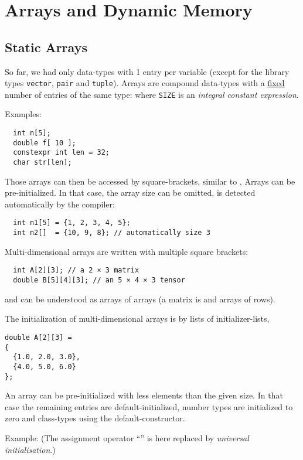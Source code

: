\section{Arrays and Dynamic Memory}
\subsection{Static Arrays}
So far, we had only data-types with 1 entry per variable (except for the library types \texttt{vector}, \texttt{pair} and \texttt{tuple}).
Arrays are compound data-types with a \underline{fixed} number of entries of the same type:
%
%
where \texttt{SIZE} is an \emph{integral constant expression}.

Examples:
\begin{verbatim}
  int n[5];
  double f[ 10 ];
  constexpr int len = 32;
  char str[len];
\end{verbatim}
%
Those arrays can then be accessed by square-brackets, similar to , \eg
%
%
Arrays can be pre-initialized. In that case, the array size can be omitted, \ie is detected
automatically by the compiler:
\begin{verbatim}
  int n1[5] = {1, 2, 3, 4, 5};
  int n2[]  = {10, 9, 8}; // automatically size 3
\end{verbatim}

Multi-dimensional arrays are written with multiple square brackets:
%
\begin{verbatim}
  int A[2][3]; // a 2 × 3 matrix
  double B[5][4][3]; // an 5 × 4 × 3 tensor
\end{verbatim}
%
and can be understood as arrays of arrays (a matrix is and arrays of rows).

The initialization of multi-dimensional arrays is by lists of initializer-lists, \eg
%
\begin{verbatim}
double A[2][3] =
{
  {1.0, 2.0, 3.0},
  {4.0, 5.0, 6.0}
};
\end{verbatim}

\begin{rem}
  An array can be pre-initialized with less elements than the given size. In that case the remaining entries are default-initialized, \ie
  number types are initialized to zero and class-types using the default-constructor.

  Example:
  (The assignment operator ``\cpp{=}'' is here replaced by \textit{universal initialisation}.)
\end{rem}


